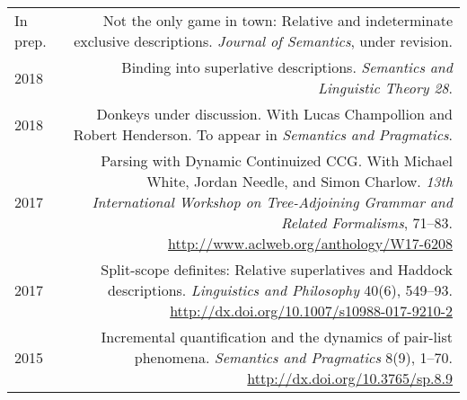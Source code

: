 \documentclass[12pt]{article}
\renewcommand{\arraystretch}{1.25} %
\newcommand{\doi}[1]{\url{http://dx.doi.org/#1}}
\newcommand{\refmark}{\textcolor{gray}{\textdagger}}
\begin{document}
\begingroup
\renewcommand{\arraystretch}{1.5} %
\begin{longtable}{LR}
  In prep.  & Not the only game in town: Relative and indeterminate exclusive
              descriptions.\newline
              \textit{Journal of Semantics}, under revision.\\
  2018  & Binding into superlative descriptions.\newline
              \textit{Semantics and Linguistic Theory 28}.\\
  2018  & Donkeys under discussion.\newline
          With Lucas Champollion and Robert Henderson.\newline
          To appear in \textit{Semantics and Pragmatics}.\\
  2017  & Parsing with Dynamic Continuized CCG.\newline
          With Michael White, Jordan Needle, and Simon Charlow.\newline
          \textit{13th International Workshop on Tree-Adjoining Grammar and
          Related Formalisms}, 71--83.\newline
          \url{http://www.aclweb.org/anthology/W17-6208}\\
  2017  & Split-scope definites: Relative superlatives and Haddock
          descriptions.\newline
          \textit{Linguistics and Philosophy} 40(6), 549--93.\newline
          \doi{10.1007/s10988-017-9210-2}\\
  2015  & Incremental quantification and the dynamics of pair-list phenomena.\newline
          \textit{Semantics and Pragmatics} 8(9), 1--70.\newline
          \doi{10.3765/sp.8.9}\\

\end{longtable}
\end{document}

